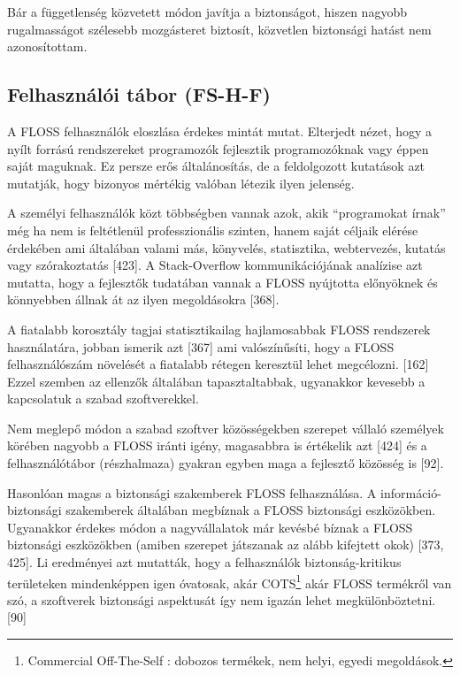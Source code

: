 \documentclass[12pt,magyar,a4paper,oneside]{scrreprt}
\begin{document}
Bár a függetlenség közvetett módon javítja a biztonságot, hiszen nagyobb
rugalmasságot szélesebb mozgásteret biztosít, közvetlen biztonsági
hatást nem azonosítottam.

\hypertarget{sec:FS-H-F}{%
\subsection{Felhasználói tábor (FS-H-F)}\label{sec:FS-H-F}}

A FLOSS felhasználók eloszlása érdekes mintát mutat. Elterjedt nézet,
hogy a nyílt forrású rendszereket programozók fejlesztik programozóknak
vagy éppen saját maguknak. Ez persze erős általánosítás, de a
feldolgozott kutatások azt mutatják, hogy bizonyos mértékig valóban
létezik ilyen jelenség.

A személyi felhasználók közt többségben vannak azok, akik ``programokat
írnak'' még ha nem is feltétlenül professzionális szinten, hanem saját
céljaik elérése érdekében ami általában valami más, könyvelés,
statisztika, webtervezés, kutatás vagy szórakoztatás {[}423{]}. A
Stack-Overflow kommunikációjának analízise azt mutatta, hogy a
fejlesztők tudatában vannak a FLOSS nyújtotta előnyöknek és könnyebben
állnak át az ilyen megoldásokra {[}368{]}.

A fiatalabb korosztály tagjai statisztikailag hajlamosabbak FLOSS
rendszerek használatára, jobban ismerik azt {[}367{]} ami valószínűsíti,
hogy a FLOSS felhasználószám növelését a fiatalabb rétegen keresztül
lehet megcélozni. {[}162{]} Ezzel szemben az ellenzők általában
tapasztaltabbak, ugyanakkor kevesebb a kapcsolatuk a szabad
szoftverekkel.

Nem meglepő módon a szabad szoftver közösségekben szerepet vállaló
személyek körében nagyobb a FLOSS iránti igény, magasabbra is értékelik
azt {[}424{]} és a felhasználótábor (részhalmaza) gyakran egyben maga a
fejlesztő közösség is {[}92{]}.

Hasonlóan magas a biztonsági szakemberek FLOSS felhasználása. A
információ-biztonsági szakemberek általában megbíznak a FLOSS biztonsági
eszközökben. Ugyanakkor érdekes módon a nagyvállalatok már kevésbé
bíznak a FLOSS biztonsági eszközökben (amiben szerepet játszanak az
alább kifejtett okok) {[}373, 425{]}. Li eredményei azt mutatták, hogy a
felhasználók biztonság-kritikus területeken mindenképpen igen óvatosak,
akár COTS\footnote{Commercial Off-The-Self : dobozos termékek, nem
  helyi, egyedi megoldások.} akár FLOSS termékről van szó, a szoftverek
biztonsági aspektusát így nem igazán lehet megkülönböztetni. {[}90{]}
\end{document}
